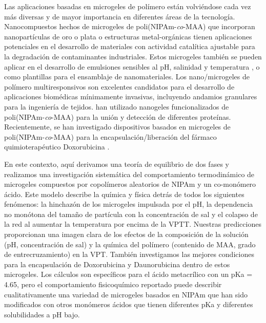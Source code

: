 Las aplicaciones basadas en microgeles de pol\'imero est\'an volvi\'endose cada vez m\'as diversas y de mayor importancia en diferentes \'areas de la tecnolog\'ia\cite{plamper2017functional}.
Nanocompuestos hechos de microgeles de poli(NIPAm-\emph{co}-MAA) que incorporan nanopart\'iculas de oro o plata o estructuras metal-org\'anicas tienen aplicaciones potenciales en el desarrollo de materiales con actividad catal\'itica ajustable para la degradaci\'on de contaminantes industriales\cite{Khan2013synthesis,Shi2014,Allegretto2020}.
Estos microgeles tambi\'en se pueden aplicar en el desarrollo de emulsiones sensibles al pH, salinidad y temperatura \cite{Ngai2005,Ngai2006,Brugger2008,Schmidt2011}, o como plantillas para el ensamblaje de nanomateriales\cite{Wong2009}.
Los nano/microgeles de pol\'imero multiresponsivos son excelentes candidatos para el desarrollo de aplicaciones biom\'edicas m\'inimamente invasivas, incluyendo andamios granulares para la ingenier\'ia de tejidos\cite{Daly2020}.
\citet{Culver2017A} han utilizado nanogeles funcionalizados de poli(NIPAm-\emph{co}-MAA) para la uni\'on y detecci\'on de diferentes prote\'inas.
Recientemente, se han investigado dispositivos basados en microgeles de poli(NIPAm-\emph{co}-MAA) para la encapsulaci\'on/liberaci\'on del f\'armaco quimioterap\'eutico Doxorubicina \cite{Giussi2020,MartinezMoro2020,Pergushov2020}.

En este contexto, aqu\'i derivamos una teor\'ia de equilibrio de dos fases y realizamos una investigaci\'on sistem\'atica del comportamiento termodin\'amico de microgeles compuestos por copol\'imeros aleatorios de NIPAm y un co-mon\'omero \'acido.
Este modelo describe la qu\'imica y f\'isica detr\'as de todos los siguientes fen\'omenos: la hinchaz\'on de los microgeles impulsada por el pH, la dependencia no mon\'otona del tama\~no de part\'icula con la concentraci\'on de sal y el colapso de la red al aumentar la temperatura por encima de la VPTT.
Nuestras predicciones proporcionan una imagen clara de los efectos de la composici\'on de la soluci\'on (pH, concentraci\'on de sal) y la qu\'imica del pol\'imero (contenido de MAA, grado de entrecruzamiento) en la VPT.
Tambi\'en investigamos las mejores condiciones para la encapsulaci\'on de Doxorubicina y Daunorubicina dentro de estos microgeles.
Los  c\'alculos son espec\'ificos para el \'acido metacr\'ilico con un pKa = 4.65, pero el comportamiento fisicoqu\'imico reportado puede describir cualitativamente una variedad de microgeles basados en NIPAm que han sido modificados con otros mon\'omeros \'acidos que tienen diferentes pKa y diferentes solubilidades a pH bajo.


